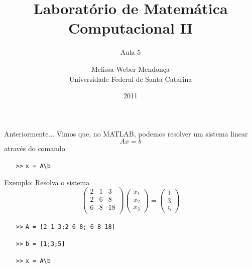 \documentclass[hyperref={pdfpagelabels=false}]{beamer}
\title{Laboratório de Matemática Computacional II}
\subtitle{Aula 5}
\author[M. Weber Mendonça]{Melissa Weber Mendonça\\
Universidade Federal de Santa Catarina}
\date{2011}
\begin{document}
\setmonofont{Inconsolata}

\begin{frame}
  \titlepage
\end{frame}

\begin{frame}{Anteriormente...}
  Vimos que, no MATLAB, podemos resolver um sistema linear 
  $$Ax=b$$
  através do comando
  \begin{itemize}
  \item[\texttt{>>}] \texttt{x = A\textbackslash b}
  \end{itemize}
  \vfill
  Exemplo: Resolva o sistema
  $$
  \begin{pmatrix}
    2 & 1 & 3\\  
    2 & 6 & 8\\
    6 & 8 & 18\\
  \end{pmatrix}
  \begin{pmatrix}
    x_1\\
    x_2\\
    x_3
  \end{pmatrix}
  = 
  \begin{pmatrix}
    1\\
    3\\
    5
  \end{pmatrix}
  $$
  \vfill
  \begin{itemize}
  \item[\texttt{>>}] \texttt{A = [2 1 3;2 6 8; 6 8 18]}
  \item[\texttt{>>}] \texttt{b = [1;3;5]}
  \item[\texttt{>>}] \texttt{x = A\textbackslash b}
  \end{itemize}
\end{frame}
\end{document}
